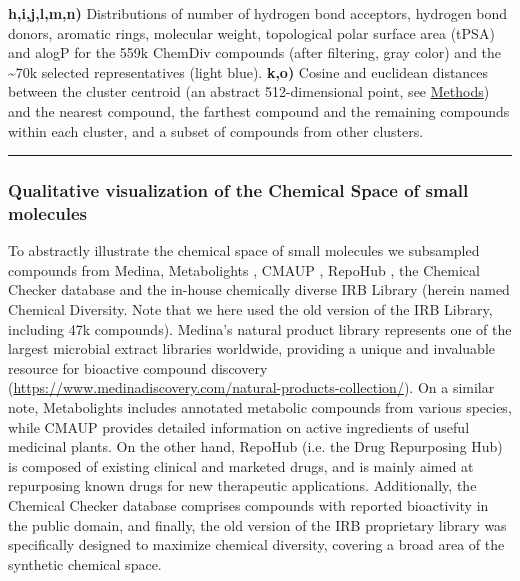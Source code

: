 \begin{Figure_modified}
{    \textbf{h,i,j,l,m,n)} Distributions of number of hydrogen bond acceptors, hydrogen bond donors, aromatic rings, molecular weight, topological polar surface area (tPSA) and alogP for the 559k ChemDiv compounds (after filtering, gray color) and the \textasciitilde70k selected representatives (light blue).
    \textbf{k,o)} Cosine and euclidean distances between the cluster centroid (an abstract 512-dimensional point, see \hyperref[Navigation_Methods]{Methods}) and the nearest compound, the farthest compound and the remaining compounds within each cluster, and a subset of compounds from other clusters.
}
  \vspace{-5mm}
  \rule[0ex]{\textwidth}{0.5pt}
  \vspace{-9mm}
  \label{Navigation_Fig1}
\end{Figure_modified}

\subsubsection{Qualitative visualization of the Chemical Space of small molecules}

To abstractly illustrate the chemical space of small molecules we subsampled compounds from Medina, Metabolights \cite{yurekten_metabolights_2024, haug_metabolights_2019}, CMAUP \cite{zeng_cmaup_2019, hou_cmaup_2024}, RepoHub \cite{corsello_drug_2017}, the Chemical Checker database \cite{duran-frigola_extending_2020} and the in-house chemically diverse IRB Library (herein named Chemical Diversity. Note that we here used the old version of the IRB Library, including 47k compounds). Medina’s natural product library represents one of the largest microbial extract libraries worldwide, providing a unique and invaluable resource for bioactive compound discovery (\hyperlink{https://www.medinadiscovery.com/natural-products-collection/}{https://www.medinadiscovery.com/natural-products-collection/}). On a similar note, Metabolights includes annotated metabolic compounds from various species, while CMAUP provides detailed information on active ingredients of useful medicinal plants. On the other hand, RepoHub (i.e. the Drug Repurposing Hub) is composed of existing clinical and marketed drugs, and is mainly aimed at repurposing known drugs for new therapeutic applications. Additionally, the Chemical Checker database comprises compounds with reported bioactivity in the public domain, and finally, the old version of the IRB proprietary library was specifically designed to maximize chemical diversity, covering a broad area of the synthetic chemical space.

